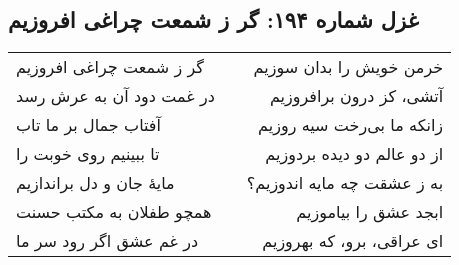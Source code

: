 \begin{center}
\section*{غزل شماره ۱۹۴: گر ز شمعت چراغی افروزیم}
\label{sec:194}
\begin{longtable}{l p{0.5cm} r}
گر ز شمعت چراغی افروزیم
&&
خرمن خویش را بدان سوزیم
\\
در غمت دود آن به عرش رسد
&&
آتشی، کز درون برافروزیم
\\
آفتاب جمال بر ما تاب
&&
زانکه ما بی‌رخت سیه روزیم
\\
تا ببینیم روی خوبت را
&&
از دو عالم دو دیده بردوزیم
\\
مایهٔ جان و دل براندازیم
&&
به ز عشقت چه مایه اندوزیم؟
\\
همچو طفلان به مکتب حسنت
&&
ابجد عشق را بیاموزیم
\\
در غم عشق اگر رود سر ما
&&
ای عراقی، برو، که بهروزیم
\\
\end{longtable}
\end{center}
